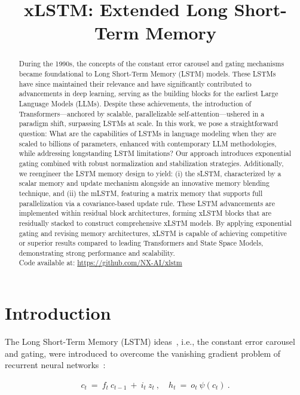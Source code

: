 \title{xLSTM: Extended Long Short-Term Memory}

\begin{abstract}
During the 1990s, the concepts of the constant error carousel and gating mechanisms became foundational to Long Short-Term Memory (LSTM) models. These LSTMs have since maintained their relevance and have significantly contributed to advancements in deep learning, serving as the building blocks for the earliest Large Language Models (LLMs). Despite these achievements, the introduction of Transformers—anchored by scalable, parallelizable self-attention—ushered in a paradigm shift, surpassing LSTMs at scale. In this work, we pose a straightforward question: What are the capabilities of LSTMs in language modeling when they are scaled to billions of parameters, enhanced with contemporary LLM methodologies, while addressing longstanding LSTM limitations? Our approach introduces exponential gating combined with robust normalization and stabilization strategies. Additionally, we reengineer the LSTM memory design to yield: (i) the sLSTM, characterized by a scalar memory and update mechanism alongside an innovative memory blending technique, and (ii) the mLSTM, featuring a matrix memory that supports full parallelization via a covariance-based update rule. These LSTM advancements are implemented within residual block architectures, forming xLSTM blocks that are residually stacked to construct comprehensive xLSTM models. By applying exponential gating and revising memory architectures, xLSTM is capable of achieving competitive or superior results compared to leading Transformers and State Space Models, demonstrating strong performance and scalability.\\
Code available at: \url{https://github.com/NX-AI/xlstm}
\end{abstract}

\section{Introduction}
\label{sec:intro}

The Long Short-Term Memory (LSTM) ideas~\citep{Hochreiter:91,Hochreiter:97nips,Hochreiter:97}, i.e., the constant error carousel and gating, were introduced to overcome the vanishing gradient problem of recurrent neural networks~\citep{Hochreiter:91,Hochreiter:00book}:

\begin{align}
\label{eq:lstm_idea}
  c_t \ = \ f_t \ c_{t-1} \ + \ 
          i_t \  z_t \ , \quad  
          h_t \ = \ o_t \ \psi({c_t}) \ . 
\end{align}

